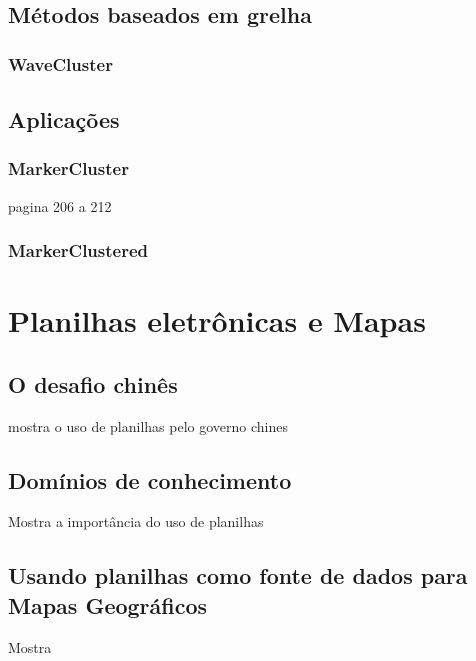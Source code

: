 	\subsection{Métodos baseados em grelha}
		\subsubsection{WaveCluster}
	\subsection{Aplicações}
		\subsubsection{MarkerCluster}
		pagina 206 a 212
		\subsubsection{MarkerClustered}



\section{Planilhas eletrônicas e Mapas}
\subsection{O desafio chinês}
mostra o uso de planilhas pelo governo chines \cite{chinaPlanilha}
\subsection{Domínios de conhecimento}
Mostra a importância do uso de planilhas \cite{credinePlanilha} 
\subsection{Usando planilhas como fonte de dados para Mapas Geográficos}
Mostra \cite{lieberman2009spatio}